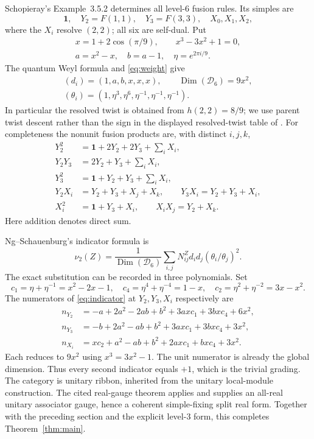 \documentclass[11pt]{amsart}
\theoremstyle{remark}
\newcommand{\D}{\mathcal D}
\begin{document}
Schopieray's Example~3.5.2 \cite{Schopieray} determines all level-$6$
fusion rules. Its simples are
\[
 \mathbf1,\quad Y_2=F(1,1),\quad Y_3=F(3,3),\quad X_0,X_1,X_2,
\]
where the $X_i$ resolve $(2,2)$; all six are self-dual. Put
\[
 \begin{gathered}
 x=1+2\cos(\pi/9),\qquad x^3-3x^2+1=0,\\
 a=x^2-x,\quad b=a-1,\quad \eta=e^{2\pi i/9}.
 \end{gathered}
\]
The quantum Weyl formula and \eqref{eq:weight} give
\begin{equation}\label{eq:sixdata}
 \begin{gathered}
 (d_i)=(1,a,b,x,x,x),\qquad \operatorname{Dim}(\D_6)=9x^2,\\
 (\theta_i)=(1,\eta^3,\eta^6,\eta^{-1},\eta^{-1},\eta^{-1}).
 \end{gathered}
\end{equation}
In particular the resolved twist is obtained from $h(2,2)=8/9$;
we use parent twist descent rather than the sign in the displayed
resolved-twist table of \cite[Example~3.5.2]{Schopieray}.
For completeness the nonunit fusion products are, with distinct $i,j,k$,
\begin{align*}
 Y_2^2&=\mathbf1+2Y_2+2Y_3+\sum_iX_i,\\
 Y_2Y_3&=2Y_2+Y_3+\sum_iX_i,\\
 Y_3^2&=\mathbf1+Y_2+Y_3+\sum_iX_i,\\
 Y_2X_i&=Y_2+Y_3+X_j+X_k,\qquad Y_3X_i=Y_2+Y_3+X_i,\\
 X_i^2&=\mathbf1+Y_3+X_i,\qquad X_iX_j=Y_2+X_k.
\end{align*}
Here addition denotes direct sum.

Ng--Schauenburg's indicator formula \cite[Theorem~7.5]{NS} is
\begin{equation}\label{eq:indicator}
 \nu_2(Z)=\frac{1}{\operatorname{Dim}(\D_6)}
       \sum_{i,j}N_{ij}^{Z}d_i d_j(\theta_i/\theta_j)^2.
\end{equation}
The exact substitution can be recorded in three polynomials. Set
\[
 c_1=\eta+\eta^{-1}=x^2-2x-1,\quad
 c_4=\eta^4+\eta^{-4}=1-x,\quad
 c_2=\eta^2+\eta^{-2}=3x-x^2.
\]
The numerators of \eqref{eq:indicator} at $Y_2,Y_3,X_i$ respectively are
\begin{align*}
 n_{Y_2}&=-a+2a^2-2ab+b^2+3axc_1+3bxc_4+6x^2,\\
 n_{Y_3}&=-b+2a^2-ab+b^2+3axc_1+3bxc_4+3x^2,\\
 n_{X_i}&=xc_2+a^2-ab+b^2+2axc_1+bxc_4+3x^2.
\end{align*}
Each reduces to $9x^2$ using $x^3=3x^2-1$.
The unit numerator is already the global dimension. Thus every second
indicator equals $+1$, which is the trivial grading. The category is
unitary ribbon, inherited from the unitary local-module construction.
The cited real-gauge theorem applies and supplies an all-real unitary
associator gauge, hence a coherent simple-fixing split real form.
Together with the preceding section and the explicit level-$3$ form,
this completes Theorem~\ref{thm:main}.
\end{document}

